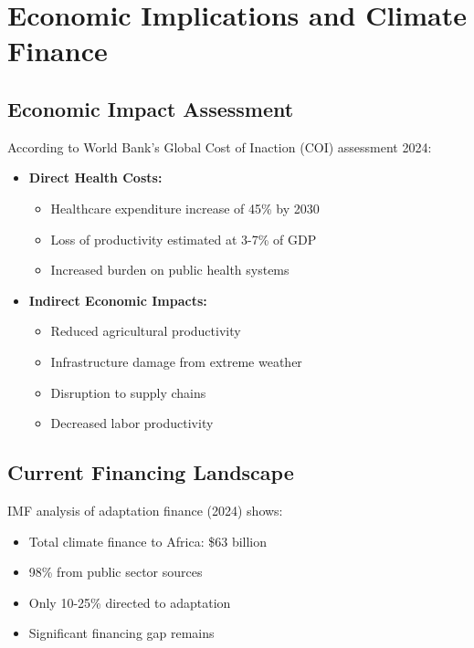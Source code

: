 \section{Economic Implications and Climate Finance}
\label{sec:economic_implications}

\subsection{Economic Impact Assessment}
According to World Bank's Global Cost of Inaction (COI) assessment 2024:

\begin{itemize}
    \item \textbf{Direct Health Costs:}
    \begin{itemize}
        \item Healthcare expenditure increase of 45\% by 2030
        \item Loss of productivity estimated at 3-7\% of GDP
        \item Increased burden on public health systems
    \end{itemize}
    
    \item \textbf{Indirect Economic Impacts:}
    \begin{itemize}
        \item Reduced agricultural productivity
        \item Infrastructure damage from extreme weather
        \item Disruption to supply chains
        \item Decreased labor productivity
    \end{itemize}
\end{itemize}

\subsection{Current Financing Landscape}
IMF analysis of adaptation finance (2024) shows:

\begin{itemize}
    \item Total climate finance to Africa: \$63 billion
    \item 98\% from public sector sources
    \item Only 10-25\% directed to adaptation
    \item Significant financing gap remains
\end{itemize}

